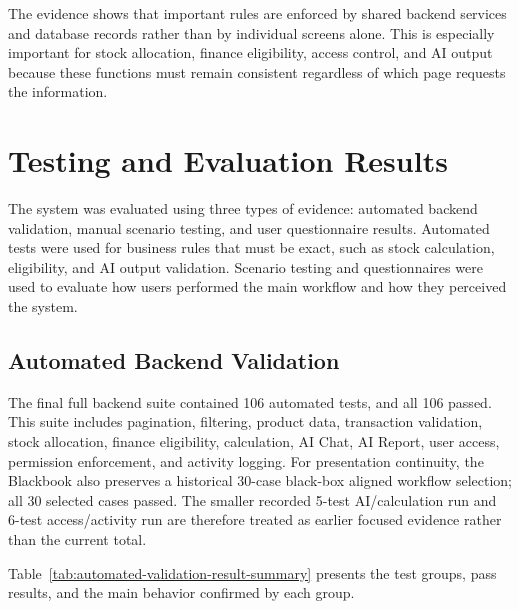 The evidence shows that important rules are enforced by shared backend services and database records rather than by individual screens alone. This is especially important for stock allocation, finance eligibility, access control, and AI output because these functions must remain consistent regardless of which page requests the information.

\section{Testing and Evaluation Results}
The system was evaluated using three types of evidence: automated backend validation, manual scenario testing, and user questionnaire results. Automated tests were used for business rules that must be exact, such as stock calculation, eligibility, and AI output validation. Scenario testing and questionnaires were used to evaluate how users performed the main workflow and how they perceived the system.

\subsection{Automated Backend Validation}
The final full backend suite contained 106 automated tests, and all 106 passed. This suite includes pagination, filtering, product data, transaction validation, stock allocation, finance eligibility, calculation, AI Chat, AI Report, user access, permission enforcement, and activity logging. For presentation continuity, the Blackbook also preserves a historical 30-case black-box aligned workflow selection; all 30 selected cases passed. The smaller recorded 5-test AI/calculation run and 6-test access/activity run are therefore treated as earlier focused evidence rather than the current total.

Table~\ref{tab:automated-validation-result-summary} presents the test groups, pass results, and the main behavior confirmed by each group.

